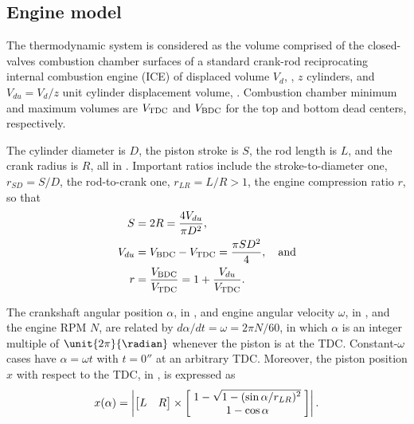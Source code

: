     \subsection{Engine model}\label{sec:model.engine}

    The thermodynamic system is considered as the volume comprised  of  the  closed-valves  combustion  chamber  surfaces  of  a
    standard crank-rod reciprocating internal combustion engine (ICE) of displaced volume $V_d$,  \meter\cubed,  $z$  cylinders,
    and $V_{du} = V_d / z$ unit cylinder displacement volume, \meter\cubed. Combustion chamber minimum and maximum  volumes  are
    $V_{\mbox{\scriptsize TDC}}$ and $V_{\mbox{\scriptsize BDC}}$ for the top and bottom dead centers, respectively.

    The cylinder diameter is $D$, the piston stroke is $S$, the rod length is $L$, and the crank radius is $R$, all  in  \meter.
    Important ratios include the stroke-to-diameter one, $r_{SD} = S/D$, the rod-to-crank one, $r_{LR} = L/R >  1$,  the  engine
    compression ratio $r$, so that%
    \begin{align}
        \label{eq:S}
        S       &= 2 R = \frac{4 V_{du}}{\pi D^{2}}, \\
        \label{eq:Vdu}
        V_{du}  &= V_{\mbox{\scriptsize BDC}} - V_{\mbox{\scriptsize TDC}} = \frac{\pi SD^2}{4}, \quad\mbox{and} \\
        \label{eq:r}
        r       &= \frac{V_{\mbox{\scriptsize BDC}}}{V_{\mbox{\scriptsize TDC}}} = 1 + \frac{V_{du}}{V_{\mbox{\scriptsize TDC}}}.
    \end{align}

    The crankshaft angular position $\alpha$, in \radian, and engine angular velocity $\omega$, in \radian\per\second,  and  the
    engine RPM $N$, are related  by  $d\alpha/dt  =  \omega  =  2\pi  N/60$,  in  which  $\alpha$  is  an  integer  multiple  of
    $\unit{2\pi}{\radian}$ whenever the piston is at the TDC. Constant-$\omega$ cases  have  $\alpha  =  \omega  t$  with  $t  =
    \unit{0}{\second}$ at an arbitrary TDC. Moreover, the piston position $x$ with respect to the TDC, in \meter,  is  expressed
    as%
    \begin{equation}
        \label{eq:x}
        x(\alpha) = \left|
                \left[\begin{matrix}L & R\end{matrix}\right] \times
                \left[\;\begin{matrix}
                    1 - \sqrt{\smash[b]{1 - (\sin\alpha / r_{LR})^2}} \\
                    1 - \cos\alpha
                \end{matrix}\;\right]
            \right|.
    \end{equation}%

